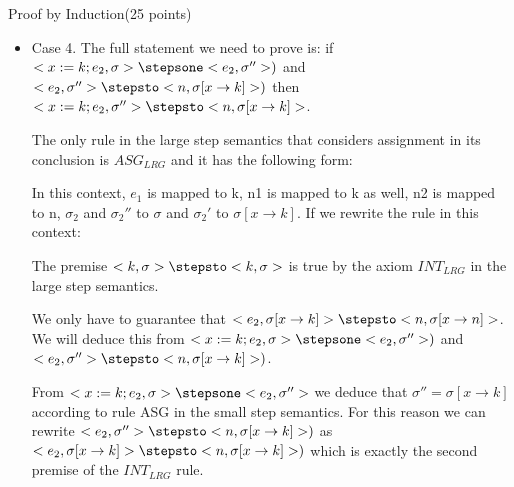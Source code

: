 \documentclass{article}
\begin{document}
\begin{question}{Proof by Induction}{(25 points)}
\begin{subquestion}
\begin{itemize}
As in case 2, from $<p, \sigma''> \stepsto <n, \sigma>)$ we deduce that $\sigma'' = \sigma$ and that $n = p$. 

What we try to prove is $<i \times k, \sigma> \stepsto <n, \sigma>$ and we have seen in the previous paragraph that $n = p$ and we also know that $p = i \times k$ because $<i+k, \sigma> \stepsone <p, \sigma''>)$. We can therefore transform the statement we want to prove to $<n, \sigma> \stepsto <n, \sigma>$ which is true according to large step semantics axiom $VAR_{LRG}$.


\item Case 4. The full statement we need to prove is: if $<x := k; e_2, \sigma> \stepsone <e_2, \sigma''>)$ and $<e_2, \sigma''> \stepsto <n, \sigma[x \rightarrow k]>)$ then $<x := k; e_2, \sigma''> \stepsto <n, \sigma[x \rightarrow k]>$. 

The only rule in the large step semantics that considers assignment in its conclusion is $ASG_{LRG}$ and it has the following form:


In this context, $e_1$ is mapped to k, n1 is mapped to k as well, n2 is mapped to n, $\sigma_2$ and $\sigma_2''$ to $\sigma$ and $\sigma_2'$ to $\sigma[x \rightarrow k]$. If we rewrite the rule in this context:


The premise $<k, \sigma> \stepsto <k, \sigma>$ is true by the axiom $INT_{LRG}$ in the large step semantics. 

We only have to guarantee that $<e_2, \sigma[x \rightarrow k]> \stepsto <n, \sigma[x \rightarrow n]>$. We will deduce this from $<x := k; e_2, \sigma> \stepsone <e_2, \sigma''>)$ and $<e_2, \sigma''> \stepsto <n, \sigma[x \rightarrow k]>)$.

From $<x := k; e_2, \sigma> \stepsone <e_2, \sigma''>$ we deduce that $\sigma'' = \sigma[x \rightarrow k]$ according to rule ASG in the small step semantics. For this reason we can rewrite $<e_2, \sigma''> \stepsto <n, \sigma[x \rightarrow k]>)$ as $<e_2, \sigma[x \rightarrow k]> \stepsto <n, \sigma[x \rightarrow k]>)$ which is exactly the second premise of the $INT_{LRG}$ rule.




\end{itemize}
\end{subquestion}
\end{question}
\end{document}
